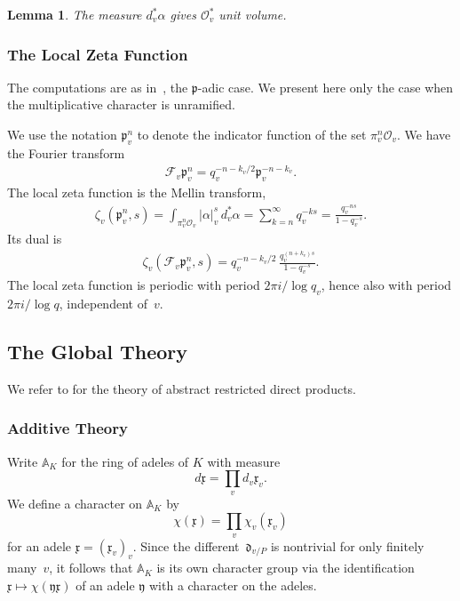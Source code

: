 \documentclass{amsart}
\newcommand\oo{\mathcal{O}}
\newcommand\pr{\mathfrak{p}}
\newcommand\diff{\mathfrak{d}}
\newcommand\Fo{\mathcal{F}}
\newcommand\A{\mathbb{A}}
\newcommand\x{\mathfrak{x}}	\newcommand\y{\mathfrak{y}}
\newtheorem{lemma}[theorem]{Lemma}
\theoremstyle{definition}\newtheorem{definition}[theorem]{Definition}
\theoremstyle{remark}\newtheorem{remark}[theorem]{Remark}
\numberwithin{equation}{section}
\begin{document}
\begin{lemma}\label{L: vol Ovstar}
The measure\/ $d_v^*\alpha$ gives\/ $\oo_v^*$ unit volume.
\end{lemma}

\subsubsection{The Local Zeta Function}
\label{S: local zeta}

The computations are as in~\cite[Section 2.5, p.~319]{Tate},
the $\pr$-adic case.
We present here only the case when the multiplicative character is unramified.

We use the notation $\pr_v^n$ to denote the indicator function of the set $\pi_v^n\oo_v$.
We have the Fourier transform
\begin{gather}\label{E:Fo_vpr^n}
\Fo_v{\pr_v^n}=q_v^{-n-k_v/2}{\pr_v^{-n-k_v}}.
\end{gather}
The local zeta function is the Mellin transform,
\begin{align}\label{E:zeta_v}
\zeta_v({\pr_v^n},s)=\int_{\pi_v^n\oo_v}|\alpha|_v^s\,d_v^*\alpha
=\sum_{k=n}^\infty q_v^{-ks}=\frac{q_v^{-ns}}{1-q_v^{-s}}.
\end{align}
Its dual is
\begin{align*}
\zeta_v(\Fo_v{\pr_v^n},s)=q_v^{-n-k_v/2}\,\frac{q_v^{(n+k_v)s}}{1-q_v^{-s}}.
\end{align*}
The local zeta function is periodic with period ${2\pi i}/\log q_v$,
hence also with period ${2\pi i}/{\log q}$,
independent of~$v$.

\subsection{The Global Theory}

We refer to \cite[Section 3]{Tate} for the theory of abstract restricted direct products.

\subsubsection{Additive Theory}

Write $\A_K$ for the ring of adeles of $K$ with measure
$$
d\x=\prod_vd_v\x_v.
$$
We define a character on $\A_K$ by
$$
\chi(\x)=\prod_v\chi_v(\x_v)
$$
for an adele $\x=(\x_v)_v$.
Since the different~$\diff_{v/P}$ is nontrivial for only finitely many~$v$,
it follows that $\A_K$ is its own character group via the identification $\x\mapsto\chi(\y\x)$ of an adele $\y$ with a character on the adeles.
\end{document}
